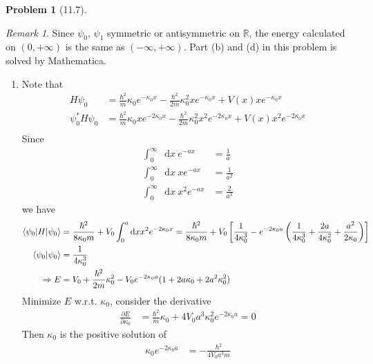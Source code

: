 \documentclass[twoside,11pt]{article}
\newcommand{\RR}{\mathbb{R}}
\renewcommand*\d{\mathop{}\!\mathrm{d}}
\theoremstyle{definition}
\newtheorem{problem}{Problem}
\theoremstyle{remark}
\newtheorem*{remark}{Remark}
\begin{document}
\begin{problem}[11.7]
\begin{remark}
Since $\psi_0$, $\psi_1$ symmetric or antisymmetric on $\RR$, 
the energy calculated on $(0,+\infty)$ is 
the same as $(-\infty, +\infty)$.
Part (b) and (d) in this problem is solved by Mathematica.
\end{remark}
\begin{enumerate}[label=(\alph*)]
\item Note that
\begin{align*}
    H\psi_0 &= \frac{\hbar^2}{m}\kappa_0 e^{-\kappa_0x} - 
    \frac{\hbar^2}{2m}\kappa_0^2 xe^{-\kappa_0 x}
    + V(x)xe^{-\kappa_0 x}\\
    \psi_0^*H\psi_0 &= \frac{\hbar^2}{m}\kappa_0 xe^{-2\kappa_0x} - 
    \frac{\hbar^2}{2m}\kappa_0^2 x^2e^{-2\kappa_0 x}
    + V(x)x^2e^{-2\kappa_0 x}\\
\end{align*}
Since
\begin{align*}
    \int_0^\infty\d x\ e^{-ax} &= \frac{1}{a}\\
    \int_0^\infty\d x\ xe^{-ax} &= \frac{1}{a^2}\\
    \int_0^\infty\d x\ x^2e^{-ax} &= \frac{2}{a^3}
\end{align*}
we have
\begin{align*}
    \braket{\psi_0|H|\psi_0} &= 
    \frac{\hbar^2}{8\kappa_0 m} + V_0\int_0^a\d x x^2 e^{-2\kappa_0 x}
    = \frac{\hbar^2}{8\kappa_0 m} + V_0\left[
        \frac{1}{4\kappa_0^3} - e^{-2\kappa_0 a}\left(
            \frac{1}{4\kappa_0^3} + 
            \frac{2a}{4\kappa_0^2} + 
            \frac{a^2}{2\kappa_0}
        \right)
    \right]
    \\
    \braket{\psi_0|\psi_0} &= 
    \frac{1}{4\kappa_0^3}\\
    \Rightarrow
    E &= V_0 + \frac{\hbar^2}{2m}\kappa_0^2 - V_0 e^{-2\kappa_0 a}
    (1+2a\kappa_0+2a^2\kappa_0^2)
\end{align*}
Minimize $E$ w.r.t. $\kappa_0$, consider the derivative
\begin{align*}
    \frac{\partial E}{\partial\kappa_0} &= 
    \frac{\hbar^2}{m}\kappa_0 + 4V_0a^3\kappa_0^2 e^{-2\kappa_0 a} 
    = 0
\end{align*}
Then $\kappa_0$ is the positive solution of
\begin{align*}
    \kappa_0 e^{-2\kappa_0 a} &= -\frac{\hbar^2}{4V_0a^3 m}
\end{align*}


\end{enumerate}
\end{problem}
\end{document}
